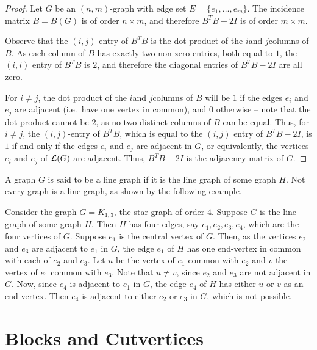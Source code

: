 \begin{proof}
	Let $G$ be an $(n, m)$-graph with edge set $E = \{e_1, \ldots, e_m\}$. The incidence matrix $B = B(G)$ is of order $n \times m$, and therefore $B^T B - 2I$ is of order $m \times m$.
	
	Observe that the $(i, j)$ entry of $B^T B$ is the dot product of the $i$\nth and $j$\nth columns of $B$. As each column of $B$ has exactly two non-zero entries, both equal to $1$, the $(i, i)$ entry of $B^T B$ is $2$, and therefore the diagonal entries of $B^T B - 2I$ are all zero.
	
	For $i \ne j$, the dot product of the $i$\nth and $j$\nth columns of $B$ will be $1$ if the edges $e_i$ and $e_j$ are adjacent (i.e.\ have one vertex in common), and $0$ otherwise -- note that the dot product cannot be $2$, as no two distinct columns of $B$ can be equal. Thus, for $i \ne j$, the $(i, j)$-entry of $B^T B$, which is equal to the $(i, j)$ entry of $B^T B - 2I$, is $1$ if and only if the edges $e_i$ and $e_j$ are adjacent in $G$, or equivalently, the vertices $e_i$ and $e_j$ of $\operatorname{\mathcal L}(G)$ are adjacent. Thus, $B^T B - 2I$ is the adjacency matrix of $G$.
\end{proof}

A graph $G$ is said to be a line graph if it is the line graph of some graph $H$. Not every graph is a line graph, as shown by the following example.

\begin{Example}
Consider the graph $G = K_{1, 3}$, the star graph of order $4$. Suppose $G$ is the line graph of some graph $H$. Then $H$ has four edges, say $e_1, e_2, e_3, e_4$, which are the four vertices of $G$. Suppose $e_1$ is the central vertex of $G$. Then, as the vertices $e_2$ and $e_3$ are adjacent to $e_1$ in $G$, the edge $e_1$ of $H$ has one end-vertex in common with each of $e_2$ and $e_3$. Let $u$ be the vertex of $e_1$ common with $e_2$ and $v$ the vertex of $e_1$ common with $e_3$. Note that $u \ne v$, since $e_2$ and $e_3$ are not adjacent in $G$. Now, since $e_4$ is adjacent to $e_1$ in $G$, the edge $e_4$ of $H$ has either $u$ or $v$ as an end-vertex. Then $e_4$ is adjacent to either $e_2$ or $e_3$ in $G$, which is not possible.
\end{Example}


\section{Blocks and Cutvertices}\label{sec:Blocks}

